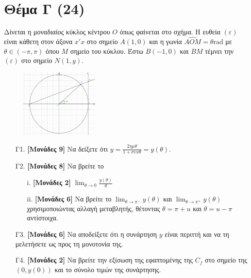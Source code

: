 \documentclass[14pt]{extarticle}
\begin{document}
\section*{Θέμα Γ (24)}
Δίνεται η μοναδιαίος κύκλος κέντρου $Ο$ όπως φαίνεται στο σχήμα. Η ευθεία $(ε)$ είναι κάθετη στον άξονα $x'x$ στο σημείο $Α(1,0)$ και η γωνία $\widehat{ΑΟΜ}=θ$rad με $θ\in(-π,π)$ όπου $Μ$ σημείο του κύκλου. Έστω $Β(-1,0)$ και $ΒΜ$ τέμνει την $(ε)$ στο σημείο $Ν(1,y)$.
\begin{figure}[H]
 \includegraphics[width=0.35\textwidth]{2021Prosomeivsi.png}
 \centering
\end{figure}
\begin{enumerate}
 \item[Γ1.] \textbf{[Μονάδες 9]} Να δείξετε ότι $y=\frac{2ημθ}{1+συνθ}=y(θ)$.
 \item[Γ2.] \textbf{[Μονάδες 8]} Να βρείτε το
       \begin{enumerate}
        \item[i.] \textbf{[Μονάδες 2]} $\lim_{θ\to 0}\frac{y(θ)}{θ}$
        \item[ii.] \textbf{[Μονάδες 6]} Να βρείτε το $\lim_{θ\to π^-}y(θ)$ και $\lim_{θ\to π^+}y(θ)$ χρησιμοποιώντας αλλαγή μεταβλητής, θέτοντας $θ=π+u$ και $θ=u-π$ αντίστοιχα.
       \end{enumerate}
 \item[Γ3.] \textbf{[Μονάδες 6]} Να αποδείξετε ότι η συνάρτηση $y$ είναι περιττή και να τη μελετήσετε ως προς τη μονοτονία της.
 \item[Γ4.] \textbf{[Μονάδες 2]} Να βρείτε την εξίσωση της εφαπτομένης της $C_f$ στο σημείο της $(0,y(0))$ και το σύνολο τιμών της συνάρτησης.
\end{enumerate}
\end{document}
